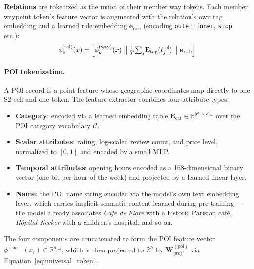 \documentclass{book}
\begin{document}
\textbf{Relations} are tokenized as the union of their member way
tokens.  Each member waypoint token's feature vector is augmented
with the relation's own tag embedding and a learned role embedding
$\mathbf{e}_{\text{role}}$ (encoding \texttt{outer},
\texttt{inner}, \texttt{stop}, etc.):
\begin{equation}
  \phi^{(\text{rel})}_k(x) =
    \Bigl[
      \phi^{(\text{way})}_k(x)
      \;\big\|\;
      \tfrac{1}{T}{\textstyle\sum_j} \mathbf{E}_{\text{tag}}(t^{\text{rel}}_j)
      \;\big\|\;
      \mathbf{e}_{\text{role}}
    \Bigr]
  \label{eq:rel_feature}
\end{equation}

\paragraph{POI tokenization.}

A POI record is a point feature whose geographic coordinates map
directly to one S2 cell and one token.  The feature extractor
combines four attribute types:

\begin{itemize}
  \item \textbf{Category}: encoded via a learned embedding table
    $\mathbf{E}_{\text{cat}} \in \mathbb{R}^{|\mathcal{C}|
    \times d_{\text{cat}}}$ over the POI category vocabulary
    $\mathcal{C}$.

  \item \textbf{Scalar attributes}: rating, log-scaled review
    count, and price level, normalized to $[0,1]$ and encoded
    by a small MLP.

  \item \textbf{Temporal attributes}: opening hours encoded as
    a 168-dimensional binary vector (one bit per hour of the
    week) and projected by a learned linear layer.

  \item \textbf{Name}: the POI name string encoded via the
    model's own text embedding layer, which carries implicit
    semantic content learned during pre-training --- the model
    already associates \emph{Café de Flore} with a historic
    Parisian café, \emph{Hôpital Necker} with a children's
    hospital, and so on.
\end{itemize}

The four components are concatenated to form the POI feature
vector $\phi^{(\text{poi})}(x_i) \in \mathbb{R}^{d_{\text{poi}}}$,
which is then projected to $\mathbb{R}^h$ by
$\mathbf{W}^{(\text{poi})}_{\text{proj}}$ via
Equation~\eqref{eq:universal_token}.
\end{document}
